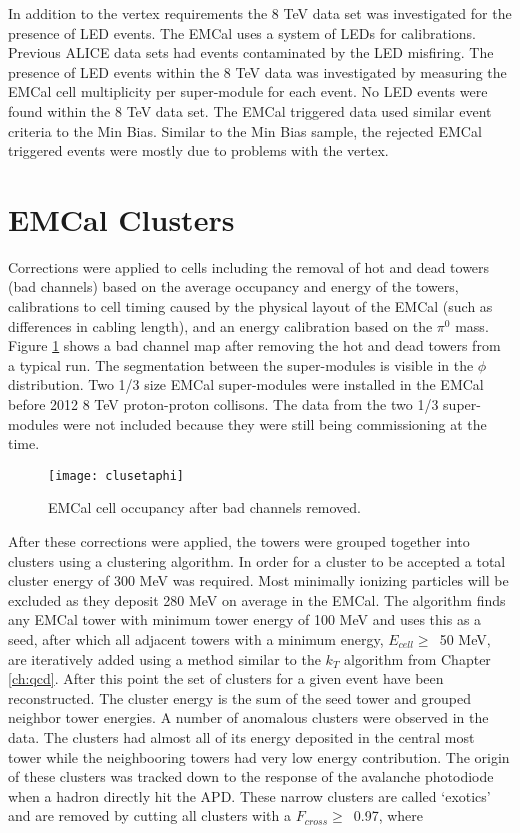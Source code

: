  In addition to the vertex requirements the 8 TeV data set was investigated for the presence of LED events.  The EMCal uses a system of LEDs for calibrations.  Previous ALICE data sets had events contaminated by the LED misfiring.  The presence of LED events within the 8 TeV data was investigated by measuring the EMCal cell multiplicity per super-module for each event.  No LED events were found within the 8 TeV data set.  The EMCal triggered data used similar event criteria to the Min Bias.  Similar to the Min Bias sample, the rejected EMCal triggered events were mostly due to problems with the vertex.


\section{EMCal Clusters}


Corrections were applied to cells including the removal of hot and dead towers (bad channels) based on the average occupancy and energy of the towers, calibrations to cell timing caused by the physical layout of the EMCal (such as differences in cabling length), and an energy calibration based on the $\pi^{0}$ mass.   Figure \ref{fig:badchannel} shows a bad channel map after removing the hot and dead towers from a typical run.  The segmentation between the super-modules is visible in the $\phi$ distribution.   Two 1/3 size EMCal super-modules were installed in the EMCal before 2012 8 TeV proton-proton collisons.  The data from the two 1/3 super-modules were not included because they were still being commissioning at the time.

\begin{figure}[t!]
\texttt{[image: clusetaphi]}
\centering
\caption{EMCal cell occupancy after bad channels removed.}
\label{fig:badchannel}
\end{figure}

After these corrections were applied, the towers were grouped together into clusters using a clustering algorithm.  In order for a cluster to be accepted a total cluster energy of 300 MeV was required.  Most minimally ionizing particles will be excluded as they deposit 280 MeV on average in the EMCal.  The algorithm finds any EMCal tower with minimum tower energy of 100 MeV and uses this as a seed, after which all adjacent towers with a minimum energy, $E_{cell} \geq \,$ 50 MeV, are iteratively added using a method similar to the $k_{T}$ algorithm from Chapter \ref{ch:qcd}.  After this point the set of clusters for a given event have been reconstructed.  The cluster energy is the sum of the seed tower and grouped neighbor tower energies.  A number of anomalous clusters were observed in the data.  The clusters had almost all of its energy deposited in the central most tower while the neighbooring towers had very low energy contribution.  The origin of these clusters was tracked down to the response of the avalanche photodiode when a hadron directly hit the APD.  These narrow clusters are called `exotics' and are removed by cutting all clusters with a $F_{cross} \geq \,$ 0.97, where


